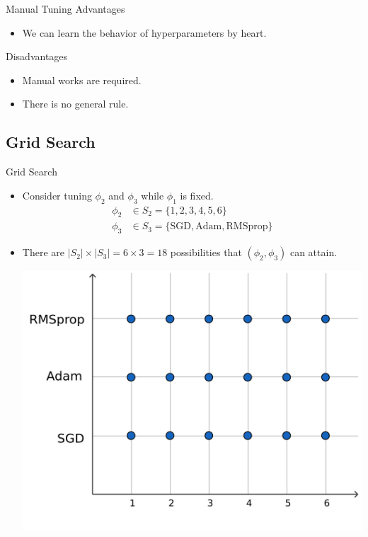 \documentclass{beamer}
\begin{document}
%
\begin{frame}{Manual Tuning}
Advantages
\begin{itemize}
\item
We can learn the behavior of hyperparameters by heart.
\end{itemize}
Disadvantages
\begin{itemize}
\item
Manual works are required.
\item
There is no general rule.
\end{itemize}
\end{frame}

\subsection{Grid Search}

%
\begin{frame}{Grid Search}
\begin{itemize}
\item
Consider tuning \(\phi_2\) and \(\phi_3\) while \(\phi_1\) is fixed.
\begin{align*}
\phi_2&\in S_2=\{1,2,3,4,5,6\}\\
\phi_3&\in S_3=\{\text{SGD},\text{Adam},\text{RMSprop}\}
\end{align*}
\item
There are \(|S_2|\times|S_3|=6\times 3=18\) possibilities that \((\phi_2,\phi_3)\) can attain.
\begin{center}
\includegraphics[width=.5\textwidth]{2_1_grid_2d}
\end{center}
\end{itemize}
\end{frame}
\end{document}
